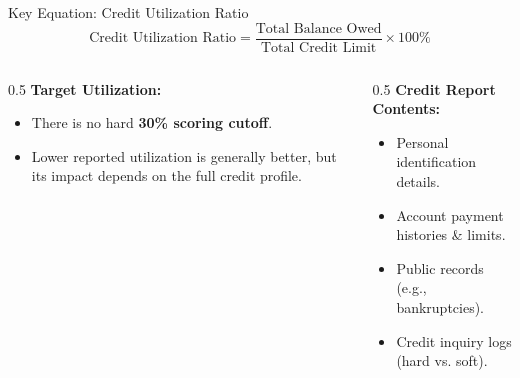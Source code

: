 \begin{block}{Key Equation: Credit Utilization Ratio}
  \[
    \text{Credit Utilization Ratio} = \frac{\text{Total Balance Owed}}{\text{Total Credit Limit}} \times 100\%
  \]
\end{block}

\vspace{0.5em}

\begin{columns}[T]
  \begin{column}{0.5\textwidth}
    \textbf{Target Utilization:}
    \begin{itemize}
      \item There is no hard \textbf{30\% scoring cutoff}.
      \item Lower reported utilization is generally better, but its impact depends on the full credit profile.
    \end{itemize}
  \end{column}
  \begin{column}{0.5\textwidth}
    \textbf{Credit Report Contents:}
    \begin{itemize}
      \item Personal identification details.
      \item Account payment histories \& limits.
      \item Public records (e.g., bankruptcies).
      \item Credit inquiry logs (hard vs. soft).
    \end{itemize}
  \end{column}
\end{columns}
